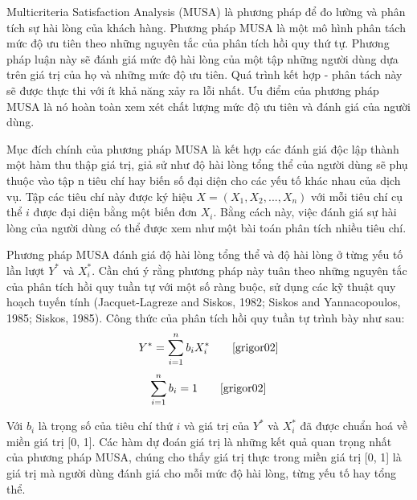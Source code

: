 \par
Multicriteria Satisfaction Analysis (MUSA) là phương pháp để đo lường và phân tích sự hài lòng của khách hàng. Phương pháp MUSA là một mô hình phân tách mức độ ưu tiên theo những nguyên tắc của phân tích hồi quy thứ tự. Phương pháp luận này sẽ đánh giá mức độ hài lòng của một tập những người dùng dựa trên giá trị của họ và những mức độ ưu tiên. Quá trình kết hợp - phân tách này sẽ được thực thi với ít khả năng xảy ra lỗi nhất. Ưu điểm của phương pháp MUSA là nó hoàn toàn xem xét chất lượng mức độ ưu tiên và đánh giá của người dùng.
\par
Mục đích chính của phương pháp MUSA là kết hợp các đánh giá độc lập thành một hàm thu thập giá trị, giả sử như độ hài lòng tổng thể của người dùng sẽ phụ thuộc vào tập n tiêu chí hay biến số đại diện cho các yếu tố khác nhau của dịch vụ. Tập các tiêu chí này được ký hiệu $X = (X_1, X_2,..., X_n)$ với mỗi tiêu chí cụ thể $i$ được đại diện bằng một biến đơn $X_i$. Bằng cách này, việc đánh giá sự hài lòng của người dùng có thể được xem như một bài toán phân tích nhiều tiêu chí.
\par
Phương pháp MUSA đánh giá độ hài lòng tổng thể và độ hài lòng ở từng yếu tố lần lượt $Y^*$ và $X_i^*$. Cần chú ý rằng phương pháp này tuân theo những nguyên tắc của phân tích hồi quy tuần tự với một số ràng buộc, sử dụng các kỹ thuật quy hoạch tuyến tính (Jacquet-Lagreze and Siskos, 1982; Siskos and Yannacopoulos, 1985; Siskos, 1985). Công thức của phân tích hồi quy tuần tự trình bày như sau:
\[ Y^* = \sum_{i=1}^{n} b_iX_i^* \tag*{\cite{grigor02}}\]
\[ \sum_{i=1}^{n} b_i = 1 \tag*{\cite{grigor02}}\]
\par
Với $b_i$ là trọng số của tiêu chí thứ $i$ và giá trị của $Y^*$ và $X_i^*$ đã được chuẩn hoá về miền giá trị [0, 1].
Các hàm dự đoán giá trị là những kết quả quan trọng nhất của phương pháp MUSA, chúng cho thấy giá trị thực trong miền giá trị [0, 1] là giá trị mà người dùng đánh giá cho mỗi mức độ hài lòng, từng yếu tố hay tổng thể.

